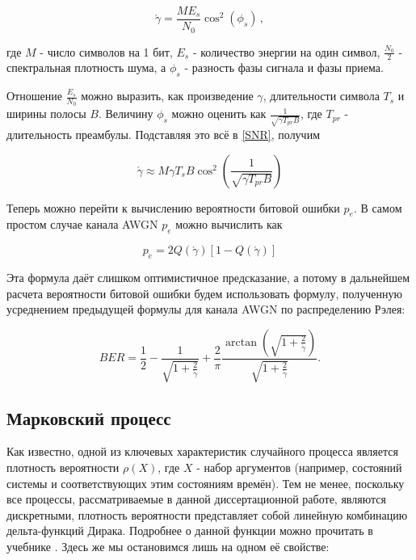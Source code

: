 \documentclass[12pt]{article}
\theoremstyle{definition}
\begin{document}
\begin{equation}
\label{SNR}
    \acute{\gamma} = \frac{M E_s}{N_0} \cos^2 (\phi_s)\,,
\end{equation}

где $M$ - число символов на 1 бит, $E_s$ - количество энергии на один символ, $\frac{N_0}{2}$ - спектральная плотность шума, а $\phi_s$ - разность фазы сигнала и фазы приема.

Отношение $\frac{E_s}{N_0}$ можно выразить, как произведение $\gamma$, длительности символа $T_s$ и ширины полосы $B$. Величину $\phi_s$ можно оценить как $\frac{1}{\sqrt{\gamma T_{pr} B}}$, где $T_{pr}$ - длительность преамбулы. Подставляя это всё в \eqref{SNR}, получим

\begin{equation}
    \acute{\gamma} \approx M \gamma T_s B \cos^2 (\frac{1}{\sqrt{\gamma T_{pr} B}})
\end{equation}

Теперь можно перейти к вычислению вероятности битовой ошибки $p_e$. В самом простом случае канала AWGN $p_e$ можно вычислить как

\begin{equation}
    p_e = 2 Q(\acute{\gamma}) [1 - Q(\acute{\gamma})]
\end{equation}

Эта формула даёт слишком оптимистичное предсказание, а потому в дальнейшем расчета вероятности битовой ошибки будем использовать формулу, полученную усреднением предыдущей формулы для канала AWGN по распределению Рэлея:

\begin{equation}
\label{BER_theory}
    BER = \frac{1}{2} - 
      \frac{1}{\sqrt{1 + \frac{2}{\acute{\gamma}}}} + 
      \frac{2}{\pi} \frac{\arctan({\sqrt{1 + \frac{2}{\acute{\gamma}}}})}{\sqrt{1 + \frac{2}{\acute{\gamma}}}}.
\end{equation}

\subsection{Марковский процесс}
\label{app:Mark}
Как известно, одной из ключевых характеристик случайного процесса является плотность вероятности $\rho(X)$, где $X$ - набор аргументов (например, состояний системы и соответствующих этим состояниям времён). Тем не менее, поскольку все процессы, рассматриваемые в данной диссертационной работе, являются дискретными, плотность вероятности представляет собой линейную комбинацию дельта-функций Дирака. Подробнее о данной функции можно прочитать в учебнике \cite{Kudryavtsev2002}. Здесь же мы остановимся лишь на одном её свойстве:
\end{document}
